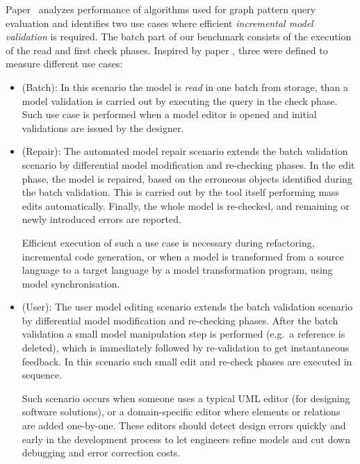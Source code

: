 Paper~\cite{icgt08-bhrv} analyzes performance of algorithms used for graph
pattern query evaluation and identifies two use cases where efficient
\emph{incremental model validation} is required. The batch part of our benchmark
consists of the execution of the read and first check phases. Inspired by paper
\cite{icgt08-bhrv}, three  were defined to measure different
use cases:
\begin{itemize}
  
  \item {} (\textsf{Batch}):
  In this scenario the model is \emph{read} in one batch from storage, than a model validation is carried out by executing the query in the check phase. Such use case is performed when a model editor is opened and initial validations are issued by the designer. 
  
  \item {} (\textsf{Repair}):
  The automated model repair scenario extends the batch validation scenario by differential model modification and re-checking phases. In the edit phase, the model is repaired, based on the erroneous objects identified during the batch validation. This is carried out by the tool itself performing mass edits automatically. Finally, the whole model is re-checked, and remaining or newly introduced errors are reported. 
  
  Efficient execution of such a use case is necessary during refactoring, incremental code generation, or when a model is transformed from a source language to a target language by a model transformation program, using model synchronisation.
  
  \item {} (\textsf{User}):
  The user model editing scenario extends the batch validation scenario by differential model modification and re-checking phases. After the batch validation a small model manipulation step is performed (e.g.\ a reference is deleted), which is immediately followed by re-validation to get instantaneous feedback.  In this scenario such small edit and re-check phases are executed in sequence.
  
  Such scenario occurs when someone uses a typical UML editor (for designing software solutions), or a domain-specific editor where elements or relations are added one-by-one. These editors should detect design errors quickly and early in the development process to let engineers refine models and cut down debugging and error correction costs.
  
\end{itemize}


